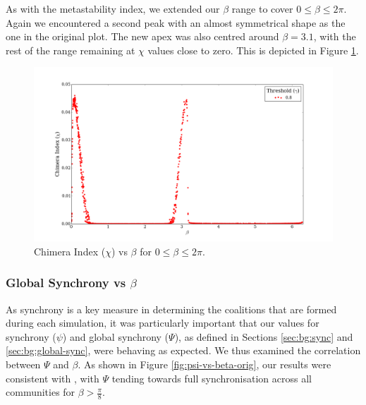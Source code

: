 \documentclass[a4paper,11pt]{article}
\begin{document}
As with the metastability index, we extended our $\beta$ range to cover $0 \leq \beta \leq 2\pi$. Again we encountered a second peak with an almost symmetrical shape as the one in the original plot. The new apex was also centred around $\beta = 3.1$, with the rest of the range remaining at $\chi$ values close to zero. This is depicted in Figure \ref{fig:chi-vs-beta-ext}.

\begin{figure}[H]
\begin{center}
\includegraphics[scale = 0.35]{figures/chi_vs_beta_ext}
\caption{
	Chimera Index ($\chi$) vs $\beta$ for $0 \leq \beta \leq 2\pi$.
	\label{fig:chi-vs-beta-ext}
}
\end{center}
\end{figure}

\subsubsection{Global Synchrony vs $\beta$}
\label{sec:app:osc:res:sync-v-beta}

As synchrony is a key measure in determining the coalitions that are formed during each simulation, it was particularly important that our values for synchrony ($\psi$) and global synchrony ($\Psi$), as defined in Sections \ref{sec:bg:sync} and \ref{sec:bg:global-sync}, were behaving as expected. We thus examined the correlation between $\Psi$ and $\beta$. As shown in Figure \ref{fig:psi-vs-beta-orig}, our results were consistent with \cite{Shanahan2010}, with $\Psi$ tending towards full synchronisation across all communities for $\beta > \frac{\pi}{8}$.
\end{document}
